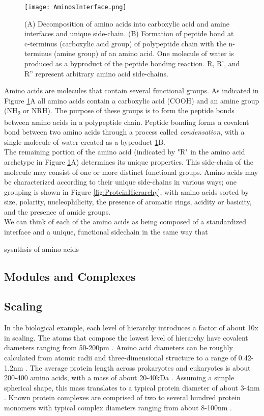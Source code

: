 {\begin{figure}
  \texttt{[image: AminosInterface.png]}
  \caption{(A) Decomposition of amino acids into carboxylic acid and amine interfaces and unique side-chain. (B) Formation of peptide bond at c-terminus (carboxylic acid group) of polypeptide chain with the n-terminus (amine group) of an amino acid. One molecule of water is produced as a byproduct of the peptide bonding reaction.  R, R', and R'' represent arbitrary amino acid side-chains.}
  \label{fig:AminosInterface}
\end{figure}

Amino acids are molecules that contain several functional groups.  As indicated in Figure \ref{fig:AminosInterface}A all amino acids contain a carboxylic acid (COOH) and an amine group (NH\textsubscript{2} or NRH).  The purpose of these groups is to form the peptide bonds between amino acids in a polypeptide chain.  Peptide bonding forms a covalent bond between two amino acids through a process called \textit{condensation}, with a single molecule of water created as a byproduct \ref{fig:AminosInterface}B.\\

The remaining portion of the amino acid (indicated by "R" in the amino acid archetype in Figure \ref{fig:AminosInterface}A) determines its unique properties.  This side-chain of the molecule may consist of one or more distinct functional groups.  Amino acids may be characterized according to their unique side-chains in various ways; one grouping is shown in Figure \ref{fig:ProteinHierarchy}, with amino acids sorted by size, polarity, nucleophilicity, the presence of aromatic rings, acidity or basicity, and the presence of amide groups.\\

We can think of each of the amino acids as being composed of a standardized interface and a unique, functional sidechain in the same way that 

sysnthsis of amino acids

 \subsection{Modules and Complexes}


\subsection{Scaling}

In the biological example, each level of hierarchy introduces a factor of about 10x in scaling.  The atoms that compose the lowest level of hierarchy have covalent diameters ranging from 50-200pm \cite{Slater1993}.  Amino acid diameters can be roughly calculated from atomic radii and three-dimensional structure to a range of 0.42-1.2nm \cite{Pool2003}.  The average protein length across prokaryotes and eukaryotes is about 200-400 amino acids, with a mass of about 20-40kDa \cite{Brocchieri2005}.  Assuming a simple spherical shape, this mass translates to a typical protein diameter of about 3-4nm \cite{Erickson2009}.  Known protein complexes are comprised of two to several hundred protein monomers with typical complex diameters ranging from about 8-100nm \cite{Yang2010a}.  

}
